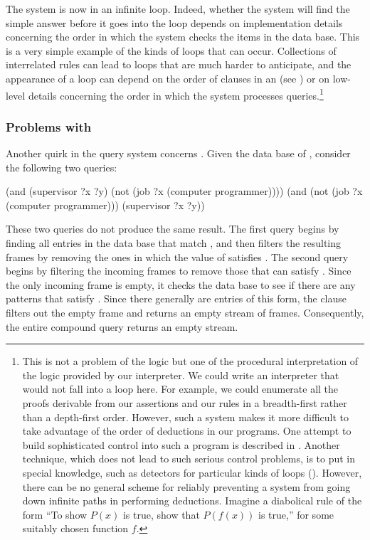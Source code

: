 \noindent
The system is now in an infinite loop.  Indeed, whether the system will find
the simple answer  before it goes into the loop
depends on implementation details concerning the order in which the system
checks the items in the data base.  This is a very simple example of the kinds
of loops that can occur.  Collections of interrelated rules can lead to loops
that are much harder to anticipate, and the appearance of a loop can depend on
the order of clauses in an  (see ) or on low-level
details concerning the order in which the system processes
queries.\footnote{This is not a problem of the logic but one of the procedural
interpretation of the logic provided by our interpreter.  We could write an
interpreter that would not fall into a loop here.  For example, we could
enumerate all the proofs derivable from our assertions and our rules in a
breadth-first rather than a depth-first order.  However, such a system makes it
more difficult to take advantage of the order of deductions in our programs.
One attempt to build sophisticated control into such a program is described in
.  Another technique, which does not lead to such serious
control problems, is to put in special knowledge, such as detectors for
particular kinds of loops ().  However, there can be no
general scheme for reliably preventing a system from going down infinite paths
in performing deductions.  Imagine a diabolical rule of the form ``To show
\( P(x) \) is true, show that \( P(f(x)) \) is true,'' for some
suitably chosen function \( f \).}

\subsubsection*{Problems with }

Another quirk in the query system concerns .  Given the data base of
, consider the following two queries:

\begin{codeBlock}
(and (supervisor ?x ?y)
     (not (job ?x (computer programmer))))
(and (not (job ?x (computer programmer)))
     (supervisor ?x ?y))
\end{codeBlock}

\noindent
These two queries do not produce the same result.  The first query begins by
finding all entries in the data base that match , and
then filters the resulting frames by removing the ones in which the value of
 satisfies .  The second query
begins by filtering the incoming frames to remove those that can satisfy
.  Since the only incoming frame is empty,
it checks the data base to see if there are any patterns that satisfy
.  Since there generally are entries of
this form, the  clause filters out the empty frame and returns an
empty stream of frames.  Consequently, the entire compound query returns an
empty stream.

